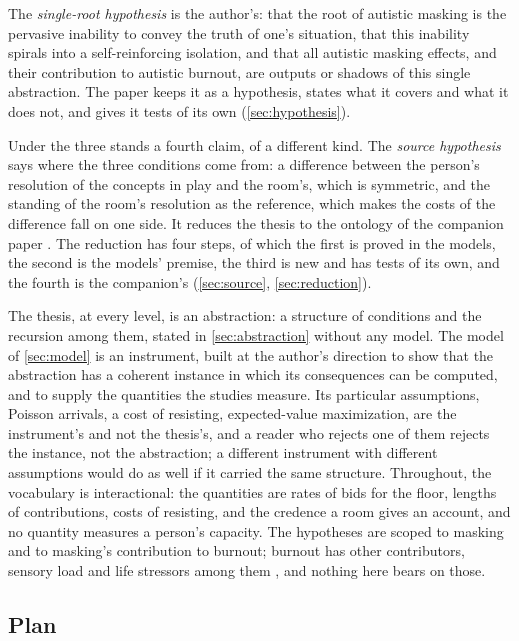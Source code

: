 The \emph{single-root hypothesis} is the author's: that the root of autistic masking is the pervasive inability to convey the truth of one's situation, that this inability spirals into a self-reinforcing isolation, and that all autistic masking effects, and their contribution to autistic burnout, are outputs or shadows of this single abstraction. The paper keeps it as a hypothesis, states what it covers and what it does not, and gives it tests of its own (\autoref{sec:hypothesis}).

Under the three stands a fourth claim, of a different kind. The \emph{source hypothesis} says where the three conditions come from: a difference between the person's resolution of the concepts in play and the room's, which is symmetric, and the standing of the room's resolution as the reference, which makes the costs of the difference fall on one side. It reduces the thesis to the ontology of the companion paper \cite{NormCost}. The reduction has four steps, of which the first is proved in the models, the second is the models' premise, the third is new and has tests of its own, and the fourth is the companion's (\autoref{sec:source}, \autoref{sec:reduction}).

The thesis, at every level, is an abstraction: a structure of conditions and the recursion among them, stated in \autoref{sec:abstraction} without any model. The model of \autoref{sec:model} is an instrument, built at the author's direction to show that the abstraction has a coherent instance in which its consequences can be computed, and to supply the quantities the studies measure. Its particular assumptions, Poisson arrivals, a cost of resisting, expected-value maximization, are the instrument's and not the thesis's, and a reader who rejects one of them rejects the instance, not the abstraction; a different instrument with different assumptions would do as well if it carried the same structure. Throughout, the vocabulary is interactional: the quantities are rates of bids for the floor, lengths of contributions, costs of resisting, and the credence a room gives an account, and no quantity measures a person's capacity. The hypotheses are scoped to masking and to masking's contribution to burnout; burnout has other contributors, sensory load and life stressors among them \cite{Raymaker2020, Mantzalas2022a}, and nothing here bears on those.

\subsection{Plan}

